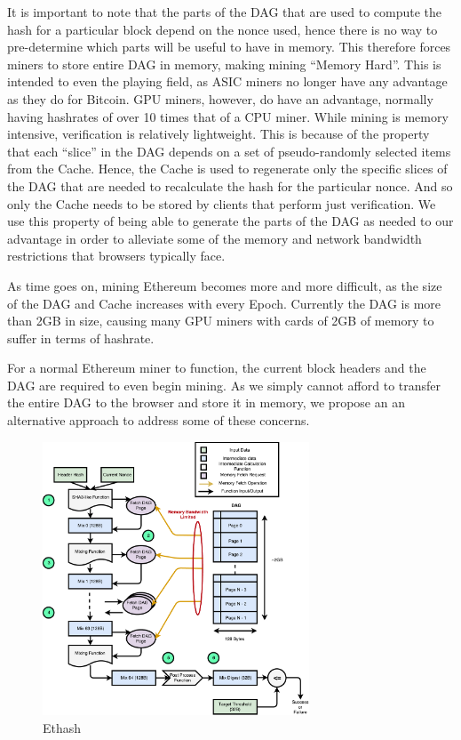 \documentclass[runningheads]{llncs}
\begin{document}
It is important to note that the parts of the DAG that are used to compute the hash for a particular block depend on the nonce used, hence there is no way to pre-determine which parts will be useful to have in memory. This therefore forces miners to store entire DAG in memory, making mining ``Memory Hard''. This is intended to even the playing field, as ASIC miners no longer have any advantage as they do for Bitcoin. GPU miners, however, do have an advantage, normally having hashrates of over 10 times that of a CPU miner.
While mining is memory intensive, verification is relatively lightweight. This is because of the property that each ``slice'' in the DAG depends on a set of pseudo-randomly selected items from the Cache. Hence, the Cache is used to regenerate only the specific slices of the DAG that are needed to recalculate the hash for the particular nonce. And so only the Cache needs to be stored by clients that perform just verification. We use this property of being able to generate the parts of the DAG as needed to our advantage in order to alleviate some of the memory and network bandwidth restrictions that browsers typically face.

As time goes on, mining Ethereum becomes more and more difficult, as the size of the DAG and Cache increases with every Epoch. Currently the DAG is more than 2GB in size, causing many GPU miners with cards of 2GB of memory to suffer in terms of hashrate. 

For a normal Ethereum miner to function, the current block headers and the DAG are required to even begin mining. As we simply cannot afford to transfer the entire DAG to the browser and store it in memory, we propose an an alternative approach to address some of these concerns.

\begin{figure}[h]
\centering
\includegraphics[width=300px,keepaspectratio]{Ethash.pdf}
\caption{\label{fig:ethash} Ethash}
\end{figure}
\end{document}
